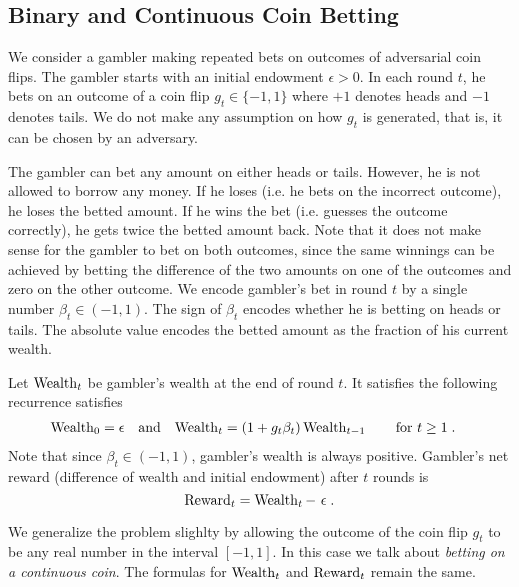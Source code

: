 \subsection{Binary and Continuous Coin Betting}

We consider a gambler making repeated bets on outcomes of adversarial coin
flips. The gambler starts with an initial endowment $\epsilon > 0$. In each
round $t$, he bets on an outcome of a coin flip $g_t \in \{-1,1\}$ where $+1$
denotes heads and $-1$ denotes tails. We do not make any assumption on how $g_t$
is generated, that is, it can be chosen by an adversary.

The gambler can bet any amount on either heads or tails. However, he is not
allowed to borrow any money. If he loses (i.e. he bets on the incorrect
outcome), he loses the betted amount. If he wins the bet (i.e. guesses the
outcome correctly), he gets twice the betted amount back.  Note that it does not
make sense for the gambler to bet on both outcomes, since the same winnings can
be achieved by betting the difference of the two amounts on one of the outcomes
and zero on the other outcome. We encode gambler's bet in round $t$ by a single
number $\beta_t \in (-1,1)$. The sign of $\beta_t$ encodes whether he is betting
on heads or tails. The absolute value encodes the betted amount as the fraction
of his current wealth.

Let $\operatorname{Wealth}_t$ be gambler's wealth at the end of round $t$. It satisfies the
following recurrence satisfies
\begin{align*}
\operatorname{Wealth}_0 & = \epsilon &
& \text{and} &
\operatorname{Wealth}_t & = (1 + g_t \beta_t) \operatorname{Wealth}_{t-1} \qquad \text{for $t \ge 1$} \; .
\end{align*}
Note that since $\beta_t \in (-1,1)$, gambler's wealth is always positive.
Gambler's net reward (difference of wealth and initial endowment) after $t$
rounds is
$$
\Reward_t = \Wealth_t - \ \epsilon \; .
$$

We generalize the problem slighlty by allowing the outcome of the coin flip
$g_t$ to be any real number in the interval $[-1,1]$. In this case we talk about
\emph{betting on a continuous coin}. The formulas for $\operatorname{Wealth}_t$ and
$\operatorname{Reward}_t$ remain the same.
